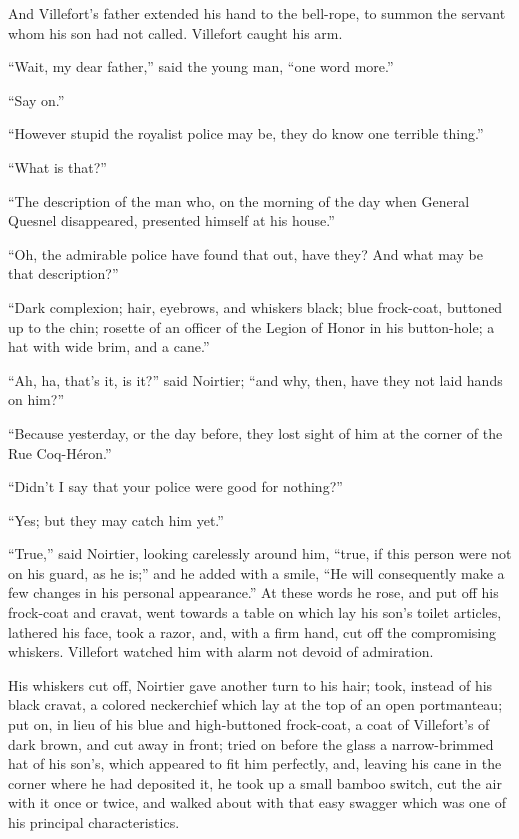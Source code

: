 And Villefort’s father extended his hand to the bell-rope, to summon
the servant whom his son had not called. Villefort caught his arm.

“Wait, my dear father,” said the young man, “one word more.”

“Say on.”

“However stupid the royalist police may be, they do know one terrible
thing.”

“What is that?”

“The description of the man who, on the morning of the day when General
Quesnel disappeared, presented himself at his house.”

“Oh, the admirable police have found that out, have they? And what may
be that description?”

“Dark complexion; hair, eyebrows, and whiskers black; blue frock-coat,
buttoned up to the chin; rosette of an officer of the Legion of Honor
in his button-hole; a hat with wide brim, and a cane.”

“Ah, ha, that’s it, is it?” said Noirtier; “and why, then, have they
not laid hands on him?”

“Because yesterday, or the day before, they lost sight of him at the
corner of the Rue Coq-Héron.”

“Didn’t I say that your police were good for nothing?”

“Yes; but they may catch him yet.”

“True,” said Noirtier, looking carelessly around him, “true, if this
person were not on his guard, as he is;” and he added with a smile, “He
will consequently make a few changes in his personal appearance.” At
these words he rose, and put off his frock-coat and cravat, went
towards a table on which lay his son’s toilet articles, lathered his
face, took a razor, and, with a firm hand, cut off the compromising
whiskers. Villefort watched him with alarm not devoid of admiration.

His whiskers cut off, Noirtier gave another turn to his hair; took,
instead of his black cravat, a colored neckerchief which lay at the top
of an open portmanteau; put on, in lieu of his blue and high-buttoned
frock-coat, a coat of Villefort’s of dark brown, and cut away in front;
tried on before the glass a narrow-brimmed hat of his son’s, which
appeared to fit him perfectly, and, leaving his cane in the corner
where he had deposited it, he took up a small bamboo switch, cut the
air with it once or twice, and walked about with that easy swagger
which was one of his principal characteristics.

